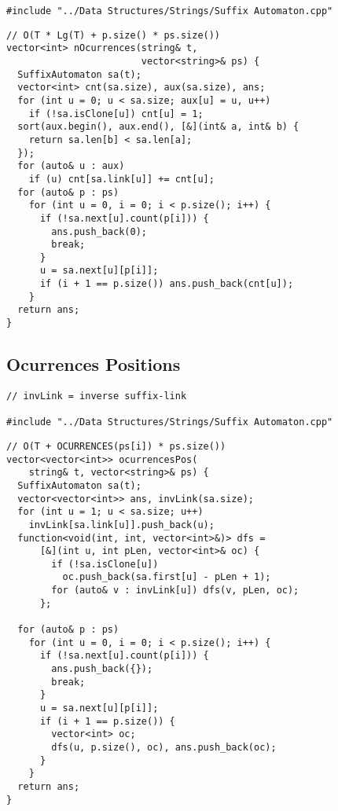 \documentclass[twoside]{article}
\begin{document}
\begin{multicols*}{2}
\begin{verbatim}
#include "../Data Structures/Strings/Suffix Automaton.cpp"
\end{verbatim}
\vspace{-12pt}
\begin{verbatim}
// O(T * Lg(T) + p.size() * ps.size())
vector<int> nOcurrences(string& t,
                        vector<string>& ps) {
  SuffixAutomaton sa(t);
  vector<int> cnt(sa.size), aux(sa.size), ans;
  for (int u = 0; u < sa.size; aux[u] = u, u++)
    if (!sa.isClone[u]) cnt[u] = 1;
  sort(aux.begin(), aux.end(), [&](int& a, int& b) {
    return sa.len[b] < sa.len[a];
  });
  for (auto& u : aux)
    if (u) cnt[sa.link[u]] += cnt[u];
  for (auto& p : ps)
    for (int u = 0, i = 0; i < p.size(); i++) {
      if (!sa.next[u].count(p[i])) {
        ans.push_back(0);
        break;
      }
      u = sa.next[u][p[i]];
      if (i + 1 == p.size()) ans.push_back(cnt[u]);
    }
  return ans;
}
\end{verbatim}

\subsectionfont{\large\bfseries\sffamily\underline}
\subsection*{Ocurrences Positions}
\begin{verbatim}
// invLink = inverse suffix-link

#include "../Data Structures/Strings/Suffix Automaton.cpp"
\end{verbatim}
\vspace{-12pt}
\begin{verbatim}
// O(T + OCURRENCES(ps[i]) * ps.size())
vector<vector<int>> ocurrencesPos(
    string& t, vector<string>& ps) {
  SuffixAutomaton sa(t);
  vector<vector<int>> ans, invLink(sa.size);
  for (int u = 1; u < sa.size; u++)
    invLink[sa.link[u]].push_back(u);
  function<void(int, int, vector<int>&)> dfs =
      [&](int u, int pLen, vector<int>& oc) {
        if (!sa.isClone[u])
          oc.push_back(sa.first[u] - pLen + 1);
        for (auto& v : invLink[u]) dfs(v, pLen, oc);
      };

  for (auto& p : ps)
    for (int u = 0, i = 0; i < p.size(); i++) {
      if (!sa.next[u].count(p[i])) {
        ans.push_back({});
        break;
      }
      u = sa.next[u][p[i]];
      if (i + 1 == p.size()) {
        vector<int> oc;
        dfs(u, p.size(), oc), ans.push_back(oc);
      }
    }
  return ans;
}
\end{verbatim}


\end{multicols*}
\end{document}
